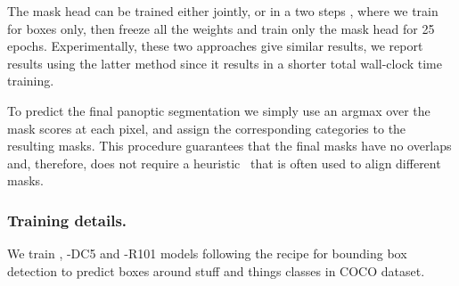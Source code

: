 The mask head can be trained either jointly, or in a two steps , where we
train \detr for boxes only, then freeze all the weights and train only the mask
head for 25 epochs. Experimentally, these two approaches give similar results,
we report results using the latter method since it results in a shorter total
wall-clock time training.


To predict the final panoptic segmentation we simply use an argmax over the mask scores at each pixel, and assign the corresponding categories to the resulting masks. This procedure guarantees that the final masks have no overlaps and, therefore, \detr does not require a heuristic~\cite{Kirillov2019panoptic} that is often used %
to align different masks.

\subsubsection{Training details.} We train \detr, \detr-DC5 and \detr-R101 models
following the recipe for bounding box detection to predict boxes around stuff
and things classes in COCO dataset.  

